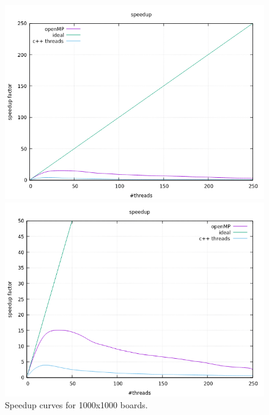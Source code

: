 \documentclass[a4paper,10pt]{article}
\begin{document}
	\begin{figure}[H]
		\centering
		\begin{minipage}[t]{0.55\linewidth}
			\includegraphics[width=\linewidth]{BenchMarkGOL/speedup/1000/graph1000.png}
		\end{minipage}%
		\begin{minipage}[t]{0.55\linewidth}
			\includegraphics[width=\linewidth]{BenchMarkGOL/speedup/1000/graph1000_zoom.png}
		\end{minipage}
		\caption{Speedup curves for 1000x1000 boards.}
		\label{1000}
	\end{figure}
\end{document}
